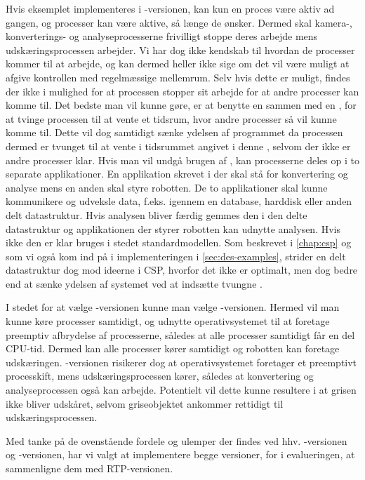 Hvis eksemplet implementeres i -versionen, kan kun  en proces være aktiv ad gangen, og processer kan være aktive, så længe de ønsker. Dermed skal kamera-, konverterings- og analyseprocesserne frivilligt stoppe deres arbejde mens  udskæringsprocessen arbejder.  Vi har dog ikke kendskab til hvordan de processer kommer til at arbejde, og kan dermed heller ikke sige om det vil være muligt at afgive kontrollen med regelmæssige mellemrum. Selv hvis dette er muligt, findes der ikke i \pycsp mulighed for at processen stopper sit arbejde for at andre  processer kan komme til. Det bedste man vil kunne gøre, er at benytte en   sammen med en , for at tvinge processen til at vente et tidsrum, hvor andre processer så vil kunne komme til. Dette vil dog samtidigt sænke ydelsen af programmet da processen dermed er tvunget til at vente i tidsrummet angivet i denne , selvom der ikke er andre processer klar. Hvis man vil undgå brugen af , kan processerne deles op i to separate applikationer. En applikation skrevet i \pycsp der skal stå for konvertering og analyse mens en anden skal styre robotten. De to applikationer skal kunne kommunikere og  udveksle data, f.eks. igennem en database, harddisk eller anden delt datastruktur. Hvis analysen bliver færdig gemmes den i den delte datastruktur og applikationen der styrer robotten kan udnytte analysen. Hvis ikke den er klar bruges i stedet standardmodellen. Som beskrevet i \autoref{chap:csp} og som vi også kom ind på i implementeringen i \autoref{sec:des-examples}, strider en delt datastruktur dog mod ideerne i CSP, hvorfor det ikke er optimalt, men dog bedre end at sænke ydelsen af systemet ved at indsætte tvungne .

I stedet for at vælge -versionen kunne man vælge -versionen. Hermed vil man kunne køre processer samtidigt, og udnytte operativsystemet til at foretage preemptiv afbrydelse af processerne, således at alle processer samtidigt får en del CPU-tid. Dermed kan alle processer kører samtidigt og robotten kan foretage udskæringen. -versionen risikerer dog at operativsystemet foretager et preemptivt processkift, mens udskæringsprocessen kører, således at konvertering og  analyseprocessen også kan arbejde. Potentielt vil dette kunne resultere i at grisen ikke bliver udskåret, selvom griseobjektet ankommer rettidigt til udskæringsprocessen.

Med tanke på de ovenstående fordele og ulemper der findes ved hhv.  -versionen og -versionen,  har vi valgt at implementere begge versioner, for i evalueringen, at sammenligne dem med RTP-versionen. 

